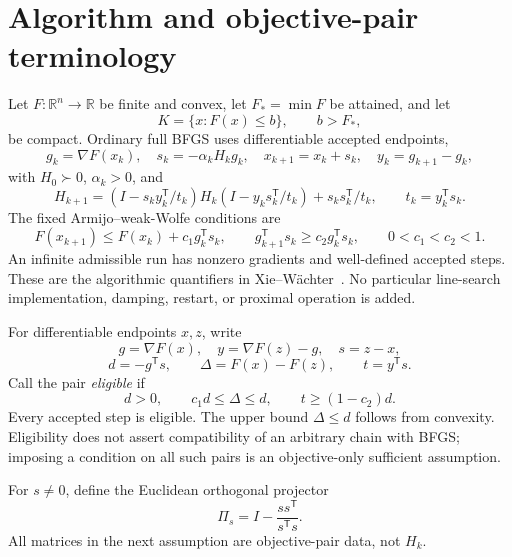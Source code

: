 \begingroup
\providecommand{\R}{}
\renewcommand{\R}{\mathbb R}
\providecommand{\tr}{}
\renewcommand{\tr}{\operatorname{tr}}
\providecommand{\diag}{}
\renewcommand{\diag}{\operatorname{diag}}
\providecommand{\Span}{}
\renewcommand{\Span}{\operatorname{span}}
\providecommand{\ip}{}
\renewcommand{\ip}[2]{\langle #1,#2\rangle}
\providecommand{\norm}{}
\renewcommand{\norm}[1]{\lVert #1\rVert}
\providecommand{\T}{}
\renewcommand{\T}{^{\mathsf T}}
\providecommand{\D}{}
\renewcommand{\D}{\mathcal D}
\setcounter{section}{1}
\setcounter{theorem}{0}
\setcounter{lemma}{0}
\setcounter{corollary}{0}
\setcounter{proposition}{0}
\setcounter{remark}{0}
\setcounter{equation}{2}
\section{Algorithm and objective-pair terminology}
Let $F:\R^n\to\R$ be finite and convex, let $F_*=\min F$ be attained, and let
\[
 K=\{x:F(x)\le b\},\qquad b>F_*,
\]
be compact. Ordinary full BFGS uses differentiable accepted endpoints,
\[
 g_k=\nabla F(x_k),\quad s_k=-\alpha_kH_kg_k,\quad
 x_{k+1}=x_k+s_k,\quad y_k=g_{k+1}-g_k,
\]
with $H_0\succ0$, $\alpha_k>0$, and
\[
 H_{k+1}=(I-s_ky_k\T/t_k)H_k(I-y_ks_k\T/t_k)+s_ks_k\T/t_k,
 \qquad t_k=y_k\T s_k.
\]
The fixed Armijo--weak-Wolfe conditions are
\[
 F(x_{k+1})\le F(x_k)+c_1g_k\T s_k,\qquad
 g_{k+1}\T s_k\ge c_2g_k\T s_k,\qquad 0<c_1<c_2<1.
\]
An infinite admissible run has nonzero gradients and well-defined accepted steps. These are the algorithmic quantifiers in Xie--W\"achter~\cite{XW}. No particular line-search implementation, damping, restart, or proximal operation is added.

For differentiable endpoints $x,z$, write
\[
 g=\nabla F(x),\quad y=\nabla F(z)-g,\quad s=z-x,
\]
\[
 d=-g\T s,\qquad \Delta=F(x)-F(z),\qquad t=y\T s.
\]
Call the pair \emph{eligible} if
\begin{equation}
 d>0,\qquad c_1d\le\Delta\le d,\qquad t\ge(1-c_2)d. \tag{T.2}
\end{equation}
Every accepted step is eligible. The upper bound $\Delta\le d$ follows from convexity. Eligibility does not assert compatibility of an arbitrary chain with BFGS; imposing a condition on all such pairs is an objective-only sufficient assumption.

For $s\ne0$, define the Euclidean orthogonal projector
\[
 \Pi_s=I-\frac{ss\T}{s\T s}.
\]
All matrices in the next assumption are objective-pair data, not $H_k$.


\setcounter{section}{2}
\setcounter{theorem}{0}
\setcounter{lemma}{0}
\setcounter{corollary}{0}
\setcounter{proposition}{0}
\setcounter{remark}{0}
\setcounter{equation}{3}
